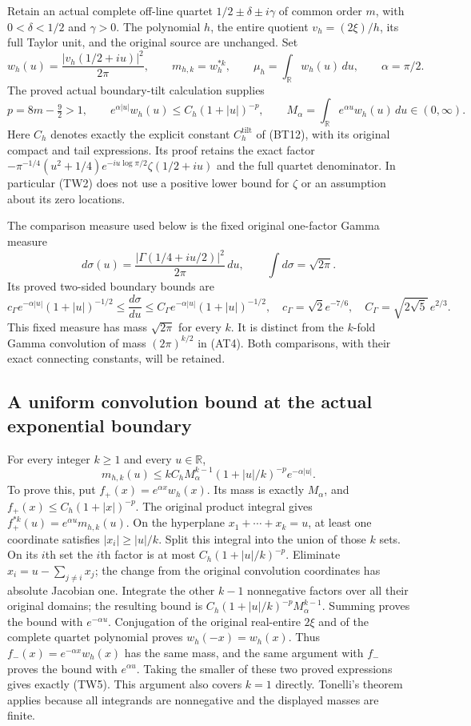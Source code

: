 Retain an actual complete off-line quartet
$1/2\pm\delta\pm i\gamma$ of common order $m$, with
$0<\delta<1/2$ and $\gamma>0$.  The polynomial $h$, the entire quotient
$v_h=(2\xi)/h$, its full Taylor unit, and the original source are unchanged.
Set
\[
 w_h(u)=\frac{|v_h(1/2+iu)|^2}{2\pi},\qquad
 m_{h,k}=w_h^{*k},\qquad \mu_h=\int_{\mathbb R}w_h(u)\,du,
 \qquad \alpha=\pi/2.
 \tag{TW1}
\]
The proved actual boundary-tilt calculation supplies
\[
 p=8m-\tfrac92>1,\qquad
 e^{\alpha|u|}w_h(u)\leq C_h(1+|u|)^{-p},\qquad
 M_\alpha=\int_{\mathbb R}e^{\alpha u}w_h(u)\,du\in(0,\infty).
 \tag{TW2}
\]
Here $C_h$ denotes exactly the explicit constant $C_h^{\mathrm{tilt}}$
of (BT12), with its original compact and tail expressions.
Its proof retains the exact factor
$-\pi^{-1/4}(u^2+1/4)e^{-iu\log\pi/2}\zeta(1/2+iu)$
and the full quartet denominator.  In particular (TW2) does not use a
positive lower bound for $\zeta$ or an assumption about its zero locations.

The comparison measure used below is the fixed original one-factor
Gamma measure
\[
 d\sigma(u)=\frac{|\Gamma(1/4+iu/2)|^2}{2\pi}\,du,
 \qquad \int d\sigma=\sqrt{2\pi}.
 \tag{TW3}
\]
Its proved two-sided boundary bounds are
\[
 c_\Gamma e^{-\alpha|u|}(1+|u|)^{-1/2}
 \leq\frac{d\sigma}{du}
 \leq C_\Gamma e^{-\alpha|u|}(1+|u|)^{-1/2},
 \quad
 c_\Gamma=\sqrt2e^{-7/6},\quad
 C_\Gamma=\sqrt{2\sqrt5}\,e^{2/3}.
 \tag{TW4}
\]
This fixed measure has mass $\sqrt{2\pi}$ for every $k$.  It is distinct
from the $k$-fold Gamma convolution of mass $(2\pi)^{k/2}$ in (AT4).
Both comparisons, with their exact connecting constants, will be retained.

\subsection{A uniform convolution bound at the actual exponential boundary}

For every integer $k\geq1$ and every $u\in\mathbb R$,
\[
 \boxed{m_{h,k}(u)\leq
 kC_hM_\alpha^{k-1}(1+|u|/k)^{-p}e^{-\alpha|u|}.}
 \tag{TW5}
\]
To prove this, put $f_+(x)=e^{\alpha x}w_h(x)$.  Its mass is exactly
$M_\alpha$, and $f_+(x)\leq C_h(1+|x|)^{-p}$.  The original product
integral gives $f_+^{*k}(u)=e^{\alpha u}m_{h,k}(u)$.
On the hyperplane $x_1+\cdots+x_k=u$, at least one coordinate satisfies
$|x_i|\geq|u|/k$.  Split this integral into the union of those $k$ sets.
On its $i$th set the $i$th factor is at most
$C_h(1+|u|/k)^{-p}$.  Eliminate $x_i=u-\sum_{j\ne i}x_j$; the change
from the original convolution coordinates has absolute Jacobian one.
Integrate the other $k-1$ nonnegative factors over all their original
domains; the resulting bound is
$C_h(1+|u|/k)^{-p}M_\alpha^{k-1}$.
Summing proves the bound with $e^{-\alpha u}$.
Conjugation of the original real-entire $2\xi$ and of the complete
quartet polynomial proves $w_h(-x)=w_h(x)$.  Thus
$f_-(x)=e^{-\alpha x}w_h(x)$ has the same mass, and the same argument
with $f_-$ proves the bound with $e^{\alpha u}$.  Taking the smaller
of these two proved expressions gives exactly (TW5).  This argument
also covers $k=1$ directly.  Tonelli's theorem applies because all
integrands are nonnegative and the displayed masses are finite.

